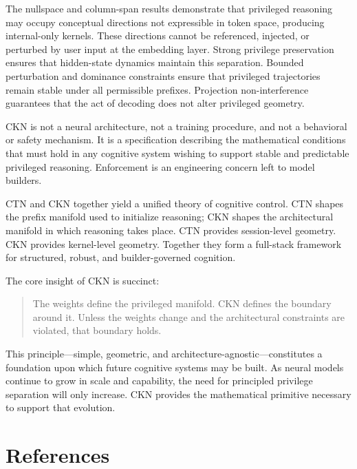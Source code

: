 \documentclass[11pt,a4paper]{article}
\begin{document}
The nullspace and column-span results demonstrate that privileged reasoning may occupy conceptual directions not expressible in token space, producing internal-only kernels. These directions cannot be referenced, injected, or perturbed by user input at the embedding layer. Strong privilege preservation ensures that hidden-state dynamics maintain this separation. Bounded perturbation and dominance constraints ensure that privileged trajectories remain stable under all permissible prefixes. Projection non-interference guarantees that the act of decoding does not alter privileged geometry.

CKN is not a neural architecture, not a training procedure, and not a behavioral or safety mechanism. It is a specification describing the mathematical conditions that must hold in any cognitive system wishing to support stable and predictable privileged reasoning. Enforcement is an engineering concern left to model builders.

CTN and CKN together yield a unified theory of cognitive control. CTN shapes the prefix manifold used to initialize reasoning; CKN shapes the architectural manifold in which reasoning takes place. CTN provides session-level geometry. CKN provides kernel-level geometry. Together they form a full-stack framework for structured, robust, and builder-governed cognition.

The core insight of CKN is succinct:
\begin{quote}
The weights define the privileged manifold. CKN defines the boundary around it. Unless the weights change and the architectural constraints are violated, that boundary holds.
\end{quote}

This principle---simple, geometric, and architecture-agnostic---constitutes a foundation upon which future cognitive systems may be built. As neural models continue to grow in scale and capability, the need for principled privilege separation will only increase. CKN provides the mathematical primitive necessary to support that evolution.

\section*{References}
\end{document}
